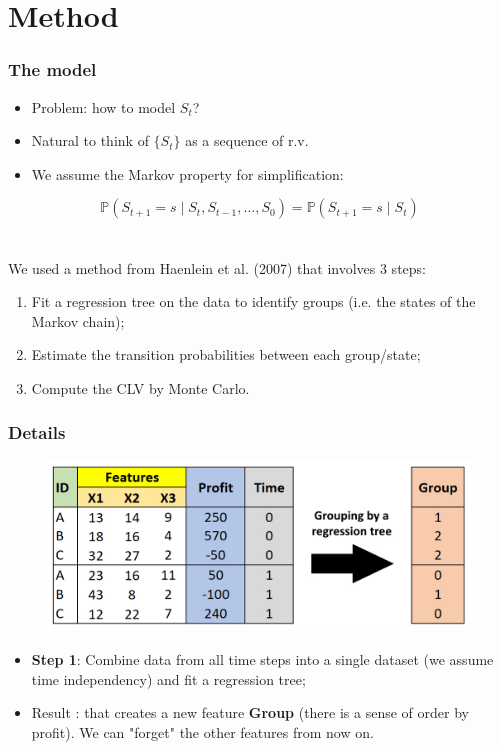 \documentclass[aspectratio=169,xcolor=x11names,compress]{beamer}
\newcommand{\Prob}{\mathbb{P}}
\begin{document}
\section{Method}

\begin{frame}
\frametitle{The model}

\begin{itemize}
	\item Problem: how to model $S_t$?
	\item Natural to think of $\{S_t\}$ as a sequence of r.v.
	\item We assume the Markov property for simplification:
\end{itemize}
\[ \Prob(S_{t+1} = s \mid S_t, S_{t-1}, \dots, S_0) = \Prob(S_{t+1} = s \mid S_t) \]
\\~\\
We used a method from Haenlein et al. (2007) that involves 3 steps:

\begin{enumerate}
	\item Fit a regression tree on the data to identify groups (i.e. the states of the Markov chain);
	\item Estimate the transition probabilities between each group/state;
	\item Compute the CLV by Monte Carlo.
\end{enumerate}

\end{frame}


\begin{frame}
\frametitle{Details}

\begin{figure}
	\includegraphics[scale = 0.3]{tree_result.jpg}
\end{figure}
	
\begin{itemize}
	\item \textbf{Step 1}: Combine data from all time steps into a single dataset (we assume time independency) and fit a regression tree;
	\item Result : that creates a new feature \textbf{Group} (there is a sense of order by profit). We can "forget" the other features from now on. 
\end{itemize}
\end{frame}
\end{document}
